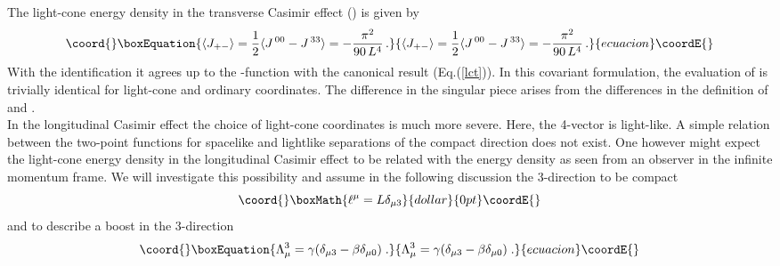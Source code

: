 \documentclass[a4paper,twocolumn,eqsecnum,aps]{revtex4}
\begin{document}
The light-cone energy density in the transverse Casimir effect (\coordHE{})  is given by 
\begin{equation}\coord{}\boxEquation{
  \label{lced}
  \langle J_{+ - }\rangle = \frac{1}{2}\langle J^{\,00} - J^{\,33} \rangle = - \frac{\pi ^{2}}{90 \, L^{4}} \, .
}{
  \langle J_{+ - }\rangle = \frac{1}{2}\langle J^{\,00} - J^{\,33} \rangle = - \frac{\pi ^{2}}{90 \, L^{4}} \, .
}{ecuacion}\coordE{}\end{equation}
 With the identification
 \coordHE{} it agrees   up to the \myHighlight{$\delta$}\coordHE{}-function with the 
canonical result (Eq.(\ref{lct})). 
In this covariant formulation,  the evaluation of \coordHE{} is trivially identical for light-cone and ordinary 
coordinates. The difference in the singular piece arises from the differences in the definition 
of \coordHE{} and \coordHE{}.  \\
In the longitudinal Casimir effect the choice of light-cone coordinates is much more severe. Here, the 4-vector \myHighlight{$\ell$}\coordHE{} is light-like. A simple relation between the  two-point functions  for  spacelike and lightlike separations of the compact direction does not exist. 
One however might expect  
the  light-cone energy density in the longitudinal Casimir effect  to be related 
with  the energy density as seen from an observer in the infinite momentum frame. We will investigate this possibility and assume in the following discussion  the 3-direction  to be compact
$$\coord{}\boxMath{\ell ^{\mu} = L\delta_{\mu 3}}{dollar}{0pt}\coordE{}$$ 
and  \myHighlight{$\Lambda$}\coordHE{} to describe a boost in the 3-direction 
\begin{equation}\coord{}\boxEquation{
  \label{boo}
\Lambda^{3}_{\mu} = \gamma (\delta_{\mu 3}-\beta \delta_{\mu 0})\;.  
}{
  \Lambda^{3}_{\mu} = \gamma (\delta_{\mu 3}-\beta \delta_{\mu 0})\;.  
}{ecuacion}\coordE{}\end{equation}
 
\end{document}
